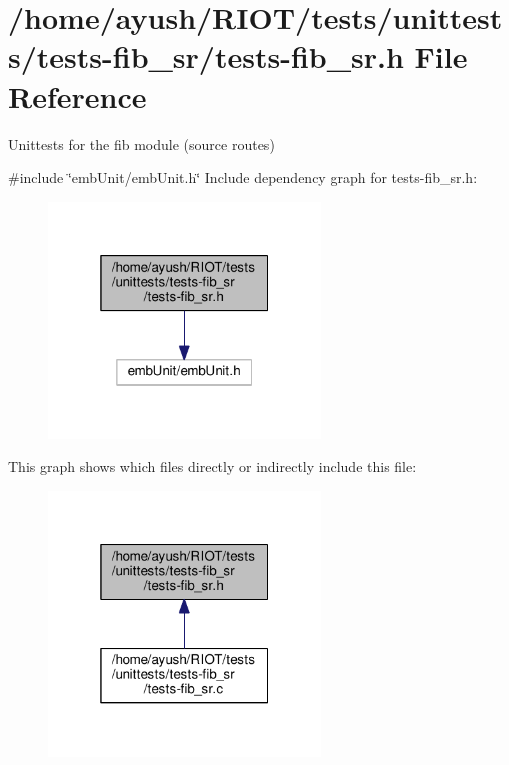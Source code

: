 \hypertarget{tests-fib__sr_8h}{}\section{/home/ayush/\+R\+I\+O\+T/tests/unittests/tests-\/fib\+\_\+sr/tests-\/fib\+\_\+sr.h File Reference}
\label{tests-fib__sr_8h}


Unittests for the {\ttfamily fib} module (source routes)  


{\ttfamily \#include \char`\"{}emb\+Unit/emb\+Unit.\+h\char`\"{}}\newline
Include dependency graph for tests-\/fib\+\_\+sr.h\+:
\nopagebreak
\begin{figure}[H]
\begin{center}
\leavevmode
\includegraphics[width=205pt]{tests-fib__sr_8h__incl}
\end{center}
\end{figure}
This graph shows which files directly or indirectly include this file\+:
\nopagebreak
\begin{figure}[H]
\begin{center}
\leavevmode
\includegraphics[width=205pt]{tests-fib__sr_8h__dep__incl}
\end{center}
\end{figure}

